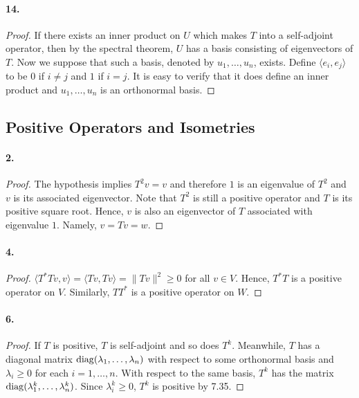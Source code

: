   \paragraph{14.}
  \begin{proof}
    If there exists an inner product on $U$ which makes $T$ into a self-adjoint
    operator, then by the spectral theorem, $U$ has a basis consisting of 
    eigenvectors of $T$. Now we suppose that such a basis, denoted by $u_1,
    \dots, u_n$, exists. Define $\langle e_i,e_j\rangle$ to be $0$ if $i\ne j$
    and $1$ if $i=j$. It is easy to verify that it does define an inner product
    and $u_1,\dots,u_n$ is an orthonormal basis.
  \end{proof}

\subsection{Positive Operators and Isometries}
  \paragraph{2.}
  \begin{proof}
    The hypothesis implies $T^2v=v$ and therefore $1$ is an eigenvalue of $T^2$
    and $v$ is its associated eigenvector. Note that $T^2$ is still a positive
    operator and $T$ is its positive square root. Hence, $v$ is also an 
    eigenvector of $T$ associated with eigenvalue $1$. Namely, $v=Tv=w$. 
  \end{proof}

  \paragraph{4.}
  \begin{proof}
    $\langle T^*Tv,v\rangle=\langle Tv,Tv\rangle = \|Tv\|^2\ge 0$ for all $v\in
    V$. Hence, $T^*T$ is a positive operator on $V$. Similarly, $TT^*$ is a 
    positive operator on $W$.
  \end{proof}

  \paragraph{6.}
  \begin{proof}
    If $T$ is positive, $T$ is self-adjoint and so does $T^k$. Meanwhile, $T$
    has a diagonal matrix $\operatorname{diag}(\lambda_1,\dots,\lambda_n)$ with respect to 
    some orthonormal basis and $\lambda_i\ge 0$ for each $i=1,\dots,n$. With
    respect to the same basis, $T^k$ has the matrix $\operatorname{diag}(\lambda_1^k,\dots,
    \lambda_n^k)$. Since $\lambda_i^k\ge 0$, $T^k$ is positive by 7.35.
  \end{proof}

